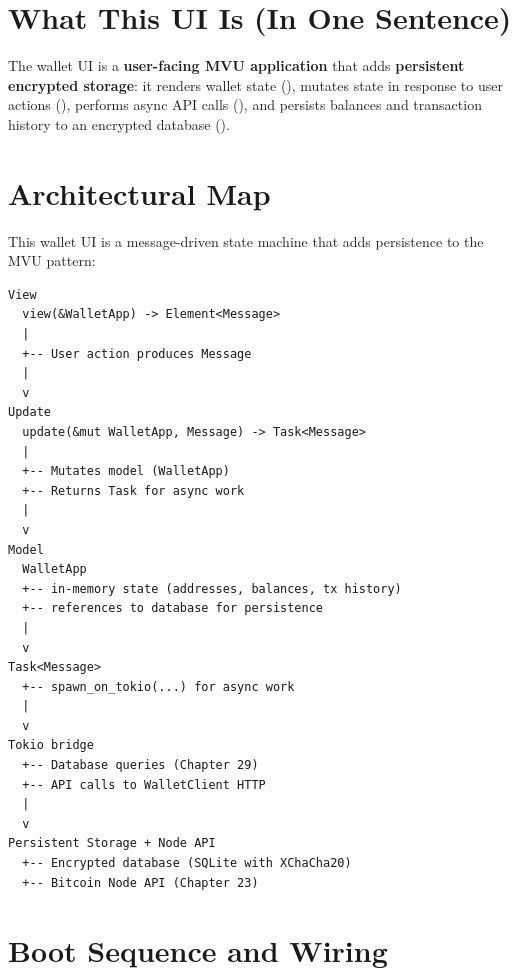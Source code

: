 \section{What This UI Is (In One Sentence)}
\label{sec:ch18-oneline}

The wallet UI is a \textbf{user-facing MVU application} that adds \textbf{persistent encrypted storage}: it renders wallet state (), mutates state in response to user actions (), performs async API calls (), and persists balances and transaction history to an encrypted database ().

\section{Architectural Map}
\label{sec:ch18-arch-map}

This wallet UI is a message-driven state machine that adds persistence to the MVU pattern:

\begin{verbatim}
View
  view(&WalletApp) -> Element<Message>
  |
  +-- User action produces Message
  |
  v
Update
  update(&mut WalletApp, Message) -> Task<Message>
  |
  +-- Mutates model (WalletApp)
  +-- Returns Task for async work
  |
  v
Model
  WalletApp
  +-- in-memory state (addresses, balances, tx history)
  +-- references to database for persistence
  |
  v
Task<Message>
  +-- spawn_on_tokio(...) for async work
  |
  v
Tokio bridge
  +-- Database queries (Chapter 29)
  +-- API calls to WalletClient HTTP
  |
  v
Persistent Storage + Node API
  +-- Encrypted database (SQLite with XChaCha20)
  +-- Bitcoin Node API (Chapter 23)
\end{verbatim}

\section{Boot Sequence and Wiring}
\label{sec:ch18-boot}


